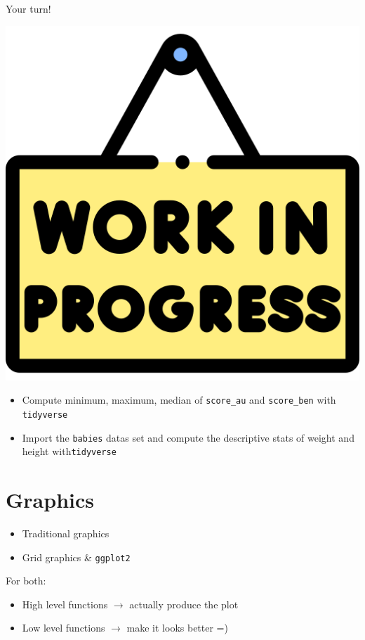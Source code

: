 \documentclass[
  ignorenonframetext,
]{beamer}
\providecommand{\tightlist}{%
  \setlength{\itemsep}{0pt}\setlength{\parskip}{0pt}}
\begin{document}
\begin{frame}[fragile]{Your turn!}
\protect\hypertarget{your-turn-1}{}
\begin{center}\includegraphics[width=0.15\linewidth]{img/work} \end{center}

\begin{itemize}
\item
  Compute minimum, maximum, median of \texttt{score\_au} and
  \texttt{score\_ben} with \texttt{tidyverse}
\item
  Import the \texttt{babies} datas set and compute the descriptive stats
  of weight and height with\texttt{tidyverse}
\end{itemize}
\end{frame}

\hypertarget{graphics}{%
\section{Graphics}\label{graphics}}

\begin{frame}[fragile]{}
\protect\hypertarget{section-4}{}
\begin{itemize}
\tightlist
\item
  Traditional graphics
\item
  Grid graphics \& \texttt{ggplot2}
\end{itemize}

For both:

\begin{itemize}
\tightlist
\item
  High level functions \(\rightarrow\) actually produce the plot
\item
  Low level functions \(\rightarrow\) make it looks better =)
\end{itemize}
\end{frame}
\end{document}
